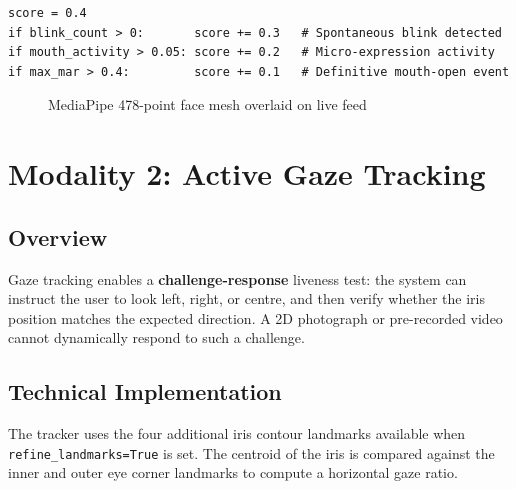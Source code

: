 \documentclass[12pt,a4paper]{report}
\begin{document}
\begin{lstlisting}[style=pythonstyle, caption={Geometric Liveness Scoring}]
score = 0.4
if blink_count > 0:       score += 0.3   # Spontaneous blink detected
if mouth_activity > 0.05: score += 0.2   # Micro-expression activity
if max_mar > 0.4:         score += 0.1   # Definitive mouth-open event
\end{lstlisting}

\begin{figure}[H]
    \centering
    \caption{MediaPipe 478-point face mesh overlaid on live feed}
    \label{fig:landmarks}
\end{figure}

\chapter{Modality 2: Active Gaze Tracking}
\label{chap:gaze}

\section{Overview}
Gaze tracking enables a \textbf{challenge-response} liveness test: the system can instruct the user to look left, right, or centre, and then verify whether the iris position matches the expected direction. A 2D photograph or pre-recorded video cannot dynamically respond to such a challenge.

\section{Technical Implementation}

The tracker uses the four additional iris contour landmarks available when \texttt{refine\_landmarks=True} is set. The centroid of the iris is compared against the inner and outer eye corner landmarks to compute a horizontal gaze ratio.
\end{document}
